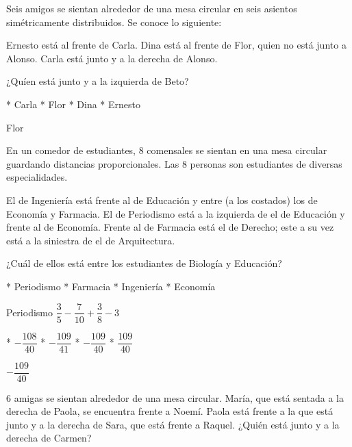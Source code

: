 \begin{mini}[.8]
	Seis amigos se sientan alrededor de una mesa circular en seis asientos sim\'etricamente distribuidos. Se conoce lo siguiente:
	\begin{itemize}
		\ii Ernesto est\'a al frente de Carla.
		\ii Dina est\'a al frente de Flor, quien no est\'a junto a Alonso.
		\ii Carla est\'a junto y a la derecha de Alonso.
	\end{itemize}
	¿Qu\'ien est\'a junto y a la izquierda de Beto?
\end{mini}
\begin{mini}[.7]
	\begin{enum*}
		* Carla
		* Flor
		* Dina
		* Ernesto
	\end{enum*}
\end{mini}
Flor
\begin{mini}[.8]
	En un comedor de estudiantes, $8$ comensales se sientan en una mesa circular guardando distancias proporcionales. Las $8$ personas son estudiantes de diversas especialidades.
	\begin{itemize}
		\ii El de Ingenier\'ia est\'a frente al de Educaci\'on y entre (a los costados) los de Econom\'ia y Farmacia.
		\ii El de Periodismo est\'a a la izquierda de el de Educaci\'on y frente al de Econom\'ia.
		\ii Frente al de Farmacia est\'a el de Derecho; este a su vez est\'a a la siniestra de el de Arquitectura.
	\end{itemize}
	¿Cu\'al de ellos est\'a entre los estudiantes de Biolog\'ia y Educaci\'on?
\end{mini}
\begin{mini}[.9]
	\begin{enum*}
		* Periodismo
		* Farmacia
		* Ingenier\'ia
		* Econom\'ia
	\end{enum*}
\end{mini}
Periodismo
$\dfrac{3}{5}-\dfrac{7}{10}+\dfrac{3}{8}-3$
\begin{mini}[.7]
	\begin{enum*}
		* $-\dfrac{108}{40}$
		* $-\dfrac{109}{41}$
		* $-\dfrac{109}{40}$
		* $\dfrac{109}{40}$
	\end{enum*}
\end{mini}
$-\dfrac{109}{40}$
\begin{mini}[.7]
	$6$ amigas se sientan alrededor de una mesa circular. Mar\'ia, que est\'a sentada a la derecha de Paola, se encuentra frente a Noem\'i. Paola est\'a frente a la que est\'a junto y a la derecha de Sara, que est\'a frente a Raquel. ¿Qui\'en est\'a junto y a la derecha de Carmen?
\end{mini}
